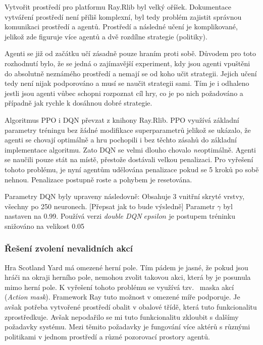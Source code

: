 Vytvořit prostředí pro platformu Ray.Rlib byl velký oříšek.
Dokumentace vytváření prostředí není příliš komplexní, byl tedy problém zajistit správnou komunikaci prostředí a agentů.
Prostředí a následné učení je komplikované, jelikož zde figuruje více agentů a dvě rozdílne strategie (politiky).

Agenti se již od začátku učí zásadně pouze hraním proti sobě.
Důvodem pro toto rozhodnutí bylo, že se jedná o zajímavější experiment, kdy jsou agenti vpuštěni do absolutně neznámého prostředí a nemají se od koho učit strategii.
Jejich učení tedy není nijak podporováno a musí se naučit strategii sami.
Tím je i odhaleno jestli jsou agenti vůbec schopni rozpoznat cíl hry, co je po nich požadováno a případně jak rychle k dosáhnou dobré strategie.

Algoritmus PPO i DQN převzat z knihony Ray.Rlib.
PPO využívá základní parametry tréningu bez žádné modifikace superparametrů jelikož se ukázalo, že agenti se chovají optimálně a hru pochopili i bez těchto zásahů do základní implementace algoritmu.
Zato DQN se velmi dlouho chovalo \emph{ne}optimálně.
Agenti se naučili pouze stát na místě, přestože dostávali velkou penalizaci.
Pro vyřešení tohoto problému, je nyní agentům udělována penalizace pokud se 5 kroků po sobě nehnou.
Penalizace postupně roste a pohybem je resetována.

Parametry DQN byly upraveny následovně:
Obsahuje 3 vnitřní skryté vrstvy, všechny po 250 neuronech.{\color {red} [Přepsat jak to bude výsledně]}
Parametr $\gamma$ byl nastaven na 0.99.
Používá verzi \emph{double DQN}
$epsilon$ je postupem tréninku snižováno na velikost 0.05

\subsubsection*{Řešení zvolení nevalidních akcí}

Hra Scotland Yard má omezené herní pole.
Tím pádem je jasné, že pokud jsou hráči na okraji herního pole, nemohou zvolit takovou akci, která by je posunula mimo herní pole.
K vyřešení tohoto problému se využívá tzv.~ maska akcí (\emph{Action mask}).
Framework Ray tuto možnost v omezené míře podporuje.
Je avšak potřeba vytvořené prostředí obalit v obalové třídě, která tuto funkcionalitu zprostředkuje.
Avšak nepodařilo se mi tuto funkcionalitu zkloubit s dalšímy požadavky systému.
Mezi těmito požadavky je fungování více aktérů s různými politikami v jednom prostředí a různé pozorovací prostory agentů.

